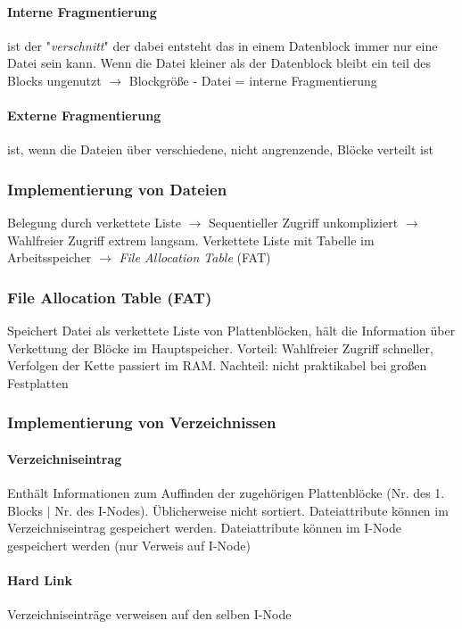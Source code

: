\documentclass[11pt,a4paper,landscape]{article}
\begin{document}
\begin{multicols*}{3}
	\paragraph{Interne Fragmentierung} ist der "\textit{verschnitt}" der dabei entsteht das in einem Datenblock immer nur eine Datei sein kann. Wenn die Datei kleiner als der Datenblock bleibt ein teil des Blocks ungenutzt $\rightarrow$ Blockgröße - Datei = interne Fragmentierung
	\paragraph{Externe Fragmentierung} ist, wenn die Dateien über verschiedene, nicht angrenzende, Blöcke verteilt ist
	\subsubsection{Implementierung von Dateien}
	Belegung durch verkettete Liste $\rightarrow$ Sequentieller Zugriff unkompliziert $\rightarrow$ Wahlfreier Zugriff extrem langsam. Verkettete Liste mit Tabelle im Arbeitsspeicher $\rightarrow$ \textit{File Allocation Table} (FAT)
	\subsubsection{File Allocation Table (FAT)}
	Speichert Datei als verkettete Liste von Plattenblöcken, hält die Information über Verkettung der Blöcke im Hauptspeicher. Vorteil: Wahlfreier Zugriff schneller, Verfolgen der Kette passiert im RAM. Nachteil: nicht praktikabel bei großen Festplatten
	\subsubsection{Implementierung von Verzeichnissen}
	\paragraph{Verzeichniseintrag} Enthält Informationen zum Auffinden der zugehörigen Plattenblöcke (Nr. des 1. Blocks $\vert$ Nr. des I-Nodes). Üblicherweise nicht sortiert. Dateiattribute können im Verzeichniseintrag gespeichert werden. Dateiattribute können im I-Node gespeichert werden (nur Verweis auf I-Node)
	\paragraph{Hard Link} Verzeichniseinträge verweisen auf den selben I-Node

\end{multicols*}
\end{document}
